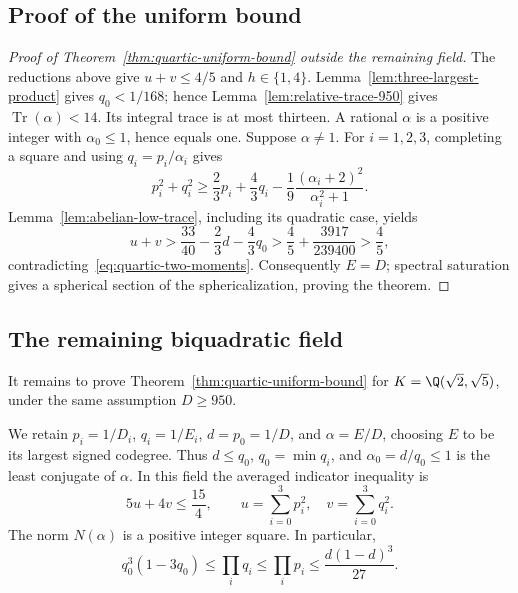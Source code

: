 \subsection{Proof of the uniform bound}

\begin{proof}[Proof of Theorem~\ref{thm:quartic-uniform-bound} outside the remaining field]
The reductions above give $u+v\le4/5$ and $h\in\{1,4\}$.
Lemma~\ref{lem:three-largest-product} gives $q_0<1/168$; hence
Lemma~\ref{lem:relative-trace-950} gives
$\operatorname{Tr}(\alpha)<14$. Its integral trace is at most
thirteen. A rational $\alpha$ is a positive integer with
$\alpha_0\le1$, hence equals one. Suppose $\alpha\ne1$.
For $i=1,2,3$, completing a square
and using $q_i=p_i/\alpha_i$ gives
\[
 p_i^2+q_i^2\ge\frac23p_i+\frac43q_i
 -\frac19\frac{(\alpha_i+2)^2}{\alpha_i^2+1}.
\]
Lemma~\ref{lem:abelian-low-trace}, including its quadratic case, yields
\[
 u+v>\frac{33}{40}-\frac23d-\frac43q_0
 >\frac45+\frac{3917}{239400}>\frac45,
\]
contradicting~\eqref{eq:quartic-two-moments}.
Consequently $E=D$; spectral saturation gives a spherical section
of the sphericalization, proving the theorem.
\end{proof}


\subsection{The remaining biquadratic field}

It remains to prove Theorem~\ref{thm:quartic-uniform-bound} for
$K=\Q(\sqrt2,\sqrt5)$, under the same assumption $D\ge950$.


We retain $p_i=1/D_i$, $q_i=1/E_i$, $d=p_0=1/D$, and
$\alpha=E/D$, choosing $E$ to be its largest signed codegree.
Thus $d\le q_0$, $q_0=\min q_i$, and $\alpha_0=d/q_0\le1$
is the least conjugate of $\alpha$. In this field the averaged
indicator inequality is
\begin{equation}\label{eq:fixed-grid}
 5u+4v\le\frac{15}{4},\qquad
 u=\sum_{i=0}^3p_i^2,\quad v=\sum_{i=0}^3q_i^2.
\end{equation}
The norm $N(\alpha)$ is a positive integer square. In particular,
\begin{equation}\label{eq:fixed-product}
 q_0^3(1-3q_0)\le\prod_iq_i\le\prod_ip_i
 \le\frac{d(1-d)^3}{27}.
\end{equation}

